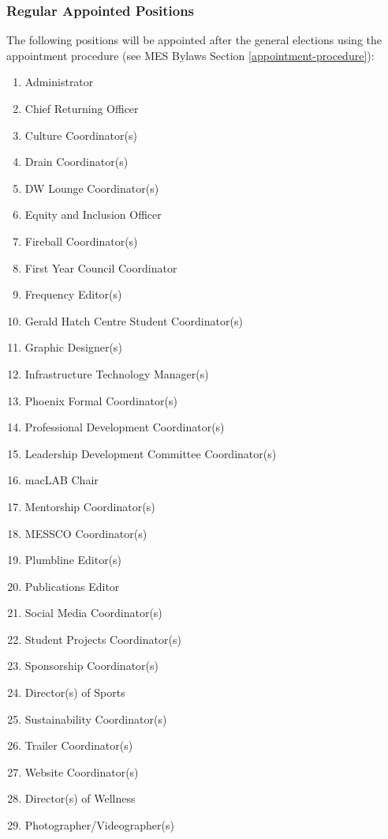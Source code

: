 \subsubsection{Regular Appointed Positions}
\label{regular-appointed-positions}
The following positions will be appointed after the general elections
using the appointment procedure (see MES Bylaws Section \ref{appointment-procedure}): %

\begin{enumerate}
 \item
  Administrator
 \item
  Chief Returning Officer
 \item
  Culture Coordinator(s)
 \item
  Drain Coordinator(s)
 \item
  DW Lounge Coordinator(s)
 \item
  Equity and Inclusion Officer
 \item
  Fireball Coordinator(s)
 \item
  First Year Council Coordinator
 \item
  Frequency Editor(s)
 \item
  Gerald Hatch Centre Student Coordinator(s)
 \item
  Graphic Designer(s)
 \item
  Infrastructure Technology Manager(s)
 \item
  Phoenix Formal Coordinator(s) 
 \item
  Professional Development Coordinator(s)
 \item
  Leadership Development Committee Coordinator(s)
 \item
  macLAB Chair
 \item
  Mentorship Coordinator(s)
 \item
  MESSCO Coordinator(s)
 \item
  Plumbline Editor(s)
 \item
  Publications Editor
 \item
  Social Media Coordinator(s)
 \item
  Student Projects Coordinator(s)
 \item
  Sponsorship Coordinator(s)
 \item
  Director(s) of Sports
 \item
  Sustainability Coordinator(s)
 \item
  Trailer Coordinator(s)
 \item
  Website Coordinator(s)
 \item
  Director(s) of Wellness   
 \item
  Photographer/Videographer(s)
\end{enumerate}

